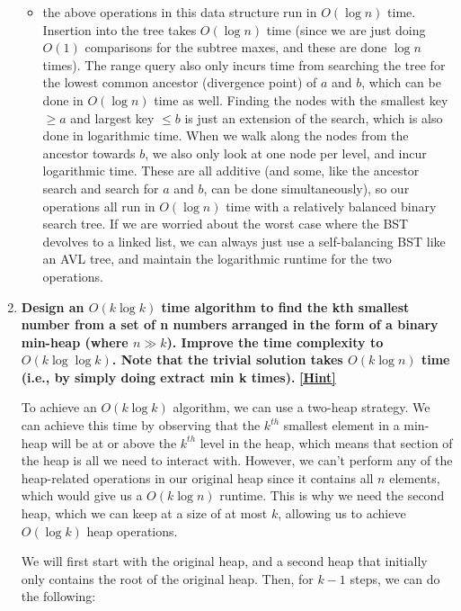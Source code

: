 \documentclass[12pt]{article}
\begin{document}
\begin{enumerate}
\begin{itemize}
        \item the above operations in this data structure run in $O(\log n)$ time. Insertion into the tree 
        takes $O(\log n)$ time (since we are just doing $O(1)$ comparisons for the subtree maxes, and these are done 
        $\log n$ times). The range query also only incurs time from searching the tree for the lowest common ancestor 
        (divergence point) of $a$ and $b$, which can be done in $O(\log n)$ time as well. Finding the nodes with the 
        smallest key $\geq a$ and largest key $\leq b$ is just an extension of the search, which is also done in logarithmic 
        time. When we walk along the nodes from the ancestor towards $b$, we also only look at one node per level, 
        and incur logarithmic time. These are all additive (and some, like the ancestor search and search for $a$ and $b$, 
        can be done simultaneously), so our operations all run in $O(\log n)$ time with a relatively balanced binary 
        search tree. If we are worried about the worst case where the BST devolves to a linked list, we can always just 
        use a self-balancing BST like an AVL tree, and maintain the logarithmic runtime for the two operations.
    \end{itemize}

    \item \textbf{Design an $O(k\log k)$ time algorithm to find the kth smallest number from a set 
    of n numbers arranged in the form of a binary min-heap (where $n \gg k$). Improve the time 
    complexity to $O(k\log \log k)$. Note that the trivial solution takes $O(k\log n)$ time (i.e., 
    by simply doing extract min k times).}
    \href{http://160592857366.free.fr/joe/ebooks/ShareData/An%20Optimal%20Algorithm%20for%20Selection%20in%20a%20Min-Heap.pdf}{\textbf{[Hint]}}

    To achieve an $O(k\log k)$ algorithm, we can use a two-heap strategy. We can achieve this time by observing that 
    the $k^{th}$ smallest element in a min-heap will be at or above the $k^{th}$ level in the heap, which means 
    that section of the heap is all we need to interact with. However, we can't perform any of the heap-related operations 
    in our original heap since it contains all $n$ elements, which would give us a $O(k\log n)$ runtime. This is why 
    we need the second heap, which we can keep at a size of at most $k$, allowing us to achieve $O(\log k)$ heap operations.
    
    We will first start with the original heap, and a second heap that initially only contains the root of the original 
    heap. Then, for $k - 1$ steps, we can do the following:


\end{enumerate}
\end{document}
